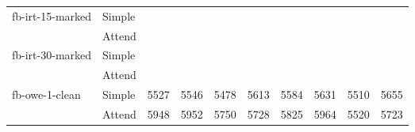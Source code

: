 \begin{tabular}{| l | l | r | r | r | r | r | r | r | r |}
    \multirow{2}{*}{fb-irt-15-marked}
    & Simple &  &  &  &  &  &  &  &  \\
    & Attend &  &  &  &  &  &  &  &  \\ \hline

    \multirow{2}{*}{fb-irt-30-marked}
    & Simple &  &  &  &  &  &  &  &  \\
    & Attend &  &  &  &  &  &  &  &  \\ \hline

    \multirow{2}{*}{fb-owe-1-clean}
    & Simple & 5527 & 5546 & 5478 & 5613 & 5584 & 5631 & 5510 & 5655 \\
    & Attend & 5948 & 5952 & 5750 & 5728 & 5825 & 5964 & 5520 & 5723 \\ \hline

\end{tabular}
